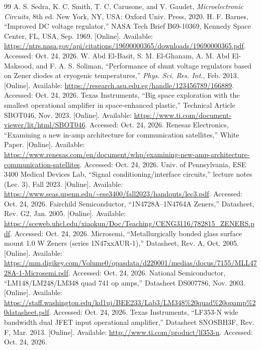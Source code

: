 \documentclass[9pt, conference]{IEEEtran}
\begin{document}
\begin{thebibliography}{99}
 A. S. Sedra, K. C. Smith, T. C. Carusone, and V. Gaudet, \emph{Microelectronic Circuits}, 8th ed. New York, NY, USA: Oxford Univ. Press, 2020.
 H. F. Barnes, ``Improved DC voltage regulator,'' NASA Tech Brief B69-10369, Kennedy Space Center, FL, USA, Sep. 1969. [Online]. Available: \url{https://ntrs.nasa.gov/api/citations/19690000365/downloads/19690000365.pdf}. Accessed: Oct. 24, 2026.
 W. Abd El-Basit, S. M. El-Ghanam, A. M. Abd El-Maksood, and F. A. S. Soliman, ``Performance of shunt voltage regulators based on Zener diodes at cryogenic temperatures,'' \emph{Phys. Sci. Res. Int.}, Feb. 2013. [Online]. Available: \url{https://research.asu.edu.eg/handle/123456789/166889}. Accessed: Oct. 24, 2026.
 Texas Instruments, ``Big space exploration with the smallest operational amplifier in space-enhanced plastic,'' Technical Article SBOT046, Nov. 2023. [Online]. Available: \url{https://www.ti.com/document-viewer/lit/html/SBOT046}. Accessed: Oct. 24, 2026.
 Renesas Electronics, ``Examining a new in-amp architecture for communication satellites,'' White Paper. [Online]. Available: \url{https://www.renesas.com/en/document/whp/examining-new-amp-architecture-communication-satellites}. Accessed: Oct. 24, 2026.
 Univ. of Pennsylvania, ESE 3400 Medical Devices Lab, ``Signal conditioning/interface circuits,'' lecture notes (Lec. 3), Fall 2023. [Online]. Available: \url{https://www.seas.upenn.edu/~ese3400/fall2023/handouts/lec3.pdf}. Accessed: Oct. 24, 2026.
 Fairchild Semiconductor, ``1N4728A--1N4764A Zeners,'' Datasheet, Rev. G2, Jan. 2005. [Online]. Available: \url{https://sceweb.uhcl.edu/xiaokun/Doc/Teaching/CENG3116/782815_ZENERS.pdf}. Accessed: Oct. 24, 2026.
 Microsemi, ``Metallurgically bonded glass surface mount 1.0 W Zeners (series 1N47xxAUR-1),'' Datasheet, Rev. A, Oct. 2005. [Online]. Available: \url{https://mm.digikey.com/Volume0/opasdata/d220001/medias/docus/7155/MLL4728A-1-Microsemi.pdf}. Accessed: Oct. 24, 2026.
 National Semiconductor, ``LM148/LM248/LM348 quad 741 op amps,'' Datasheet DS007786, Nov. 2003. [Online]. Available: \url{https://staff.washington.edu/kd1uj/BEE233/Lab3/LM348%20quad%20opamp%20datasheet.pdf}. Accessed: Oct. 24, 2026.
 Texas Instruments, ``LF353-N wide bandwidth dual JFET input operational amplifier,'' Datasheet SNOSBH3F, Rev. F, Mar. 2013. [Online]. Available: \url{http://www.ti.com/product/lf353-n}. Accessed: Oct. 24, 2026.
\end{thebibliography}
\end{document}
